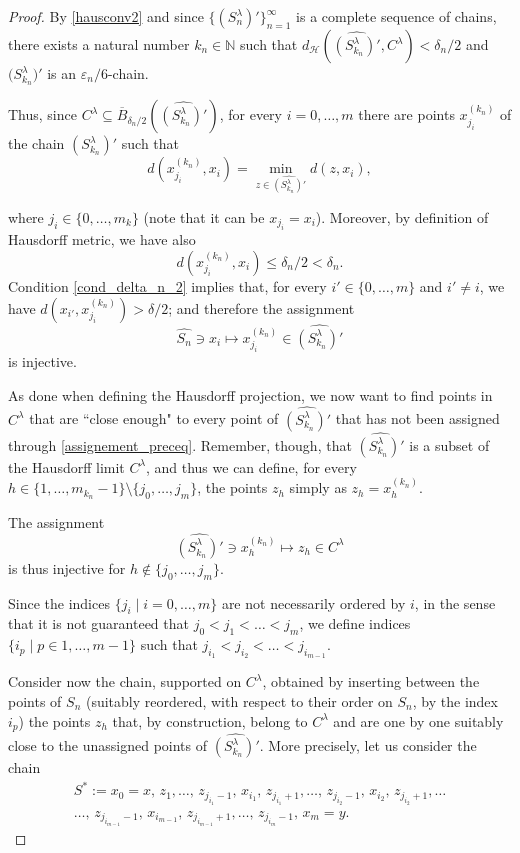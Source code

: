 \documentclass[10pt,a4paper]{article}
\theoremstyle{definition}
\theoremstyle{remark}
\theoremstyle{plain}
\begin{document}
\begin{proof}
    By \eqref{hausconv2} and since $\{({S_n^\lambda})'\}_{n=1}^{\infty}$ is a complete sequence of chains, there exists a natural number $k_n\in\mathbb N$ such that $d_\mathcal{H}(\widehat{({S_{k_n}^\lambda})'},C^\lambda)<\delta_n/2$ and ${(S_{k_n}^\lambda})'$ is an $\varepsilon_n/6$-chain.




    Thus, since $C^\lambda\subseteq \overline{B}_{\delta_n/2}(\widehat{({S^\lambda_{k_n}})'})$, for every $i=0,\dots,m$ there are points $x_{j_i}^{(k_n)}$ of the chain $({S^\lambda_{k_n}})'$ such that
    $$d(x_{j_i}^{(k_n)},x_i)=\min_{z\in \widehat{({S_{k_n}^\lambda})'}} d(z,x_i),$$
    
    where $j_i\in\{0,\dots,m_k\}$ (note that it can be $x_{j_i}=x_i$). Moreover, by definition of Hausdorff metric, we have also $$d(x_{j_i}^{(k_n)}, x_i)\leq\delta_n/2<\delta_n.$$
    Condition \eqref{cond_delta_n_2} implies that, for every $i'\in\{0,\dots,m\}$ and $i'\neq i$, we have $d(x_{i'},x_{j_i}^{(k_n)})>\delta/2$; and therefore the assignment
    \begin{equation}\label{assignement_preceq}
        \widehat{S_n}\ni x_i\mapsto x_{j_i}^{(k_n)}\in \widehat{({S^\lambda_{k_n}})'}
    \end{equation}
    is injective.

    As done when defining the Hausdorff projection, we now want to find points in $C^\lambda$ that are ``close enough" to every point of $\widehat{({S^\lambda_{k_n}})'}$ that has not been assigned through \eqref{assignement_preceq}. Remember, though, that $\widehat{({S^\lambda_{k_n}})'}$ is a subset of the Hausdorff limit $C^\lambda$, and thus we can define, for every $h\in\{1,\dots,m_{k_n}-1\}\setminus\{j_0,\dots,j_m\}$, the points $z_h$ simply as $z_h=x_h^{(k_n)}$.

    The assignment 
    \begin{equation}\label{assignment_preceq_2}
        \widehat{({S^\lambda_{k_n}})'}\ni x_h^{(k_n)}\mapsto z_h\in C^\lambda
    \end{equation}
    is thus injective for $h\notin\{j_0,\dots,j_m\}$.

    Since the indices $\{j_i\mid i=0,\dots, m\}$ are not necessarily ordered by $i$, in the sense that it is not guaranteed that $j_0<j_1<\dots<j_m$, we define indices $\{i_p\mid p\in 1,\dots, m-1\}$ such that $j_{i_1}<j_{i_2}<\dots<j_{i_{m-1}}$.
    
    Consider now the chain, supported on $C^\lambda$, obtained by inserting between the points of $S_n$ (suitably reordered, with respect to their order on $S_n$, by the index $i_p$) the points $z_h$ that, by construction, belong to $C^\lambda$ and are one by one suitably close to the unassigned points of $\widehat{({S_{k_n}^\lambda})'}$. More precisely, let us consider the chain
    \begin{multline*}
        S^*:=x_0=x,\,z_1,\dots,\,z_{j_{i_1}-1},\,x_{i_1},\,z_{j_{i_1}+1},\dots,\,z_{j_{i_2}-1},\,x_{i_2},\,z_{j_{i_2}+1},\dots\\\dots,\,z_{j_{i_{m-1}}-1},\,x_{i_{m-1}},\,z_{j_{i_{m-1}}+1},\dots,\,z_{j_{i_m}-1},\,x_m=y.
    \end{multline*}


\end{proof}
\end{document}
